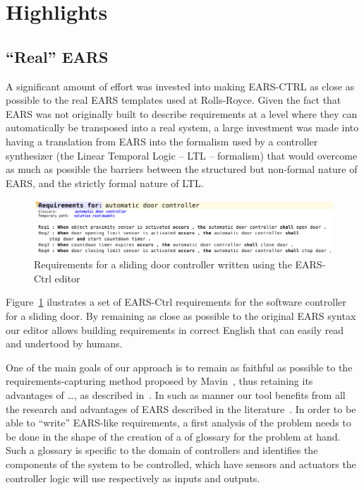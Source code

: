 \section{Highlights}

\subsection{``Real'' EARS}

A significant amount of effort was invested into making \textsf{EARS-CTRL} as close as
possible to the real EARS templates used at Rolls-Royce. Given the fact that
EARS was not originally built to describe requirements at a level where they can
automatically be transposed into a real system, a large investment was made into
having a translation from EARS into the formalism used by a controller
synthesizer (the Linear Temporal Logic -- LTL -- formalism) that would overcome 
as much as possible the barriers between the structured but non-formal nature of
EARS, and the strictly formal nature of LTL.

\begin{figure}[t]
   \begin{center}
     \includegraphics[width=1\textwidth]{images/EARS-Reqs.png}
     \caption{Requirements for a sliding door controller written using the 
     \textsf{EARS-Ctrl} editor}
     \label{fig:ears_reqs}
   \end{center}
 \end{figure}
 
Figure~\ref{fig:ears_reqs} ilustrates a set of \textsf{EARS-Ctrl} requirements
for the software controller for a sliding door. By remaining as close as
possible to the original EARS syntax our editor allows building requirements in
correct English that can easily read and undertood by humans. 

One of the main goals of our approach is to remain as faithful as possible to
the requirements-capturing method proposed by Mavin~\cite{}, thus retaining its advantages of \ldots, as
described in~\cite{}. In such as manner our tool benefits from all the research
and advantages of EARS described in the literature~\cite{}. In order to be able
to ``write'' EARS-like requirements, a first analysis of the problem needs to be
done in the shape of the creation of a of glossary for the problem at hand. Such
a glossary is specific to the domain of controllers and identifies the
components of the system to be controlled, which have sensors and actuators the
controller logic will use respectively as inputs and outputs.


